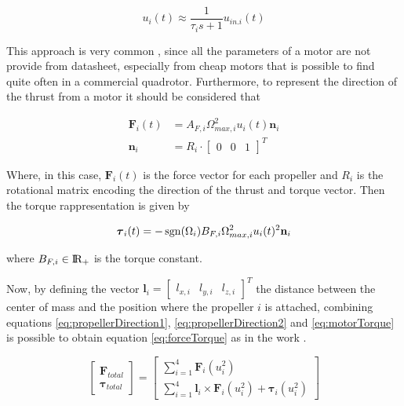 \begin{equation}
	u_i(t) \approx \frac{1}{\tau_i s+1}u_{in.i}(t)
	\label{eq:motorDelay}
\end{equation}

\noindent This approach is very common \cite{motor}, since all the parameters of a motor are not provide from datasheet, especially from cheap motors that is possible to find quite often in a commercial quadrotor. Furthermore, to represent the direction of the thrust from a motor it should be considered that 

\begin{align}
	\mathbf{F}_i(t) &= A_{F,i} \Omega_{max,i}^2u_i(t)\mathbf{n}_i \label{eq:propellerDirection1} \\
	\mathbf{n}_i &= R_i \cdot 
	\begin{bmatrix} 
		0 & 0 & 1 
	\end{bmatrix}^T 
	\label{eq:propellerDirection2}
\end{align} 

\noindent Where, in this case, $\mathbf{F}_i(t)$ is the force vector for each propeller and $R_i$ is the rotational matrix encoding the direction of the thrust and torque vector. Then the torque rappresentation is given by

\begin{equation}
	\boldsymbol{\tau}_i(t) = -\operatorname*{sgn}(\Omega_i)B_{F,i}\Omega_{max,i}^2u_i(t)^2\mathbf{n}_i
	\label{eq:motorTorque}
\end{equation}

\noindent where $B_{F,i} \in \rm I\!R_+$ is the torque constant.

\noindent Now, by defining the vector $\mathbf{l}_i = \begin{bmatrix} l_{x,i} & l_{y,i} & l_{z,i} \end{bmatrix}^T$ the distance between the center of mass and the position where the propeller $i$ is attached, combining equations \eqref{eq:propellerDirection1}, \eqref{eq:propellerDirection2} and \eqref{eq:motorTorque} is possible to obtain equation \eqref{eq:forceTorque} as in the work \cite{modelIdentification}.

\begin{equation}
	\begin{bmatrix}
		\mathbf{F}_{total} \\
		\boldsymbol{\tau}_{total}
	\end{bmatrix}
	=
	\begin{bmatrix}
		\sum\limits_{i=1}^{4} \mathbf{F}_i(u_i^2) \\
		\sum\limits_{i=1}^{4} \mathbf{l}_i \times \mathbf{F}_i(u_i^2) + \boldsymbol{\tau}_i(u_i^2)
	\end{bmatrix}
	\label{eq:forceTorque}
\end{equation}

